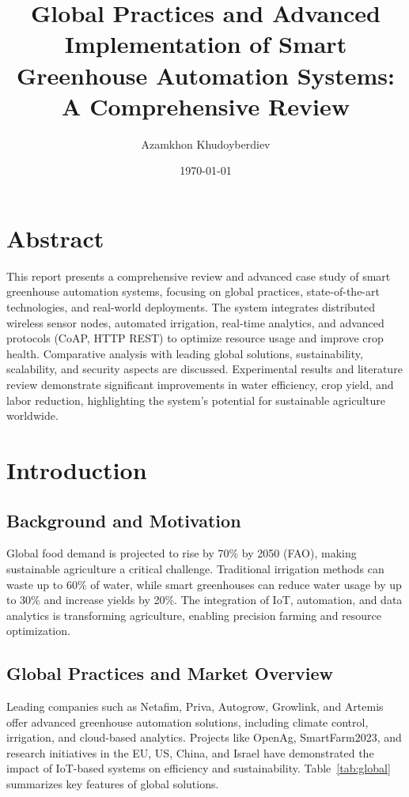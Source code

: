 \documentclass[12pt,a4paper]{article}
\title{Global Practices and Advanced Implementation of Smart Greenhouse Automation Systems: A Comprehensive Review}
\author{Azamkhon Khudoyberdiev}
\date{\today}
\begin{document}
\maketitle
\newpage
\tableofcontents
\newpage


\section*{Abstract}
This report presents a comprehensive review and advanced case study of smart greenhouse automation systems, focusing on global practices, state-of-the-art technologies, and real-world deployments. The system integrates distributed wireless sensor nodes, automated irrigation, real-time analytics, and advanced protocols (CoAP, HTTP REST) to optimize resource usage and improve crop health. Comparative analysis with leading global solutions, sustainability, scalability, and security aspects are discussed. Experimental results and literature review demonstrate significant improvements in water efficiency, crop yield, and labor reduction, highlighting the system’s potential for sustainable agriculture worldwide.


\section{Introduction}
\subsection{Background and Motivation}
Global food demand is projected to rise by 70\% by 2050 (FAO), making sustainable agriculture a critical challenge. Traditional irrigation methods can waste up to 60\% of water, while smart greenhouses can reduce water usage by up to 30\% and increase yields by 20\%. The integration of IoT, automation, and data analytics is transforming agriculture, enabling precision farming and resource optimization.

\subsection{Global Practices and Market Overview}
Leading companies such as Netafim, Priva, Autogrow, Growlink, and Artemis offer advanced greenhouse automation solutions, including climate control, irrigation, and cloud-based analytics. Projects like OpenAg, SmartFarm2023, and research initiatives in the EU, US, China, and Israel have demonstrated the impact of IoT-based systems on efficiency and sustainability. Table~\ref{tab:global} summarizes key features of global solutions.
\end{document}
